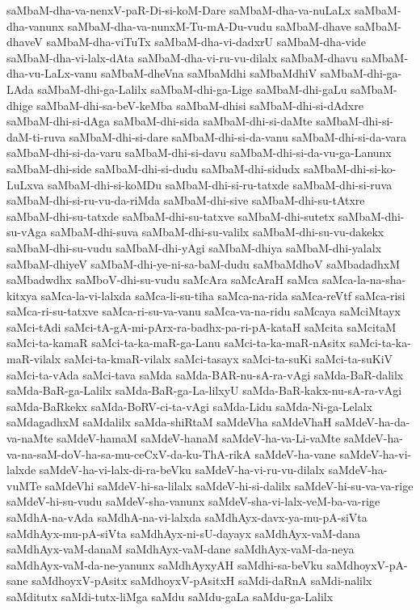 {saMbaM-dha-va-nenxV-paR-Di-si-koM-Dare
saMbaM-dha-va-nuLaLx
saMbaM-dha-vanunx
saMbaM-dha-va-nunxM-Tu-mA-Du-vudu
saMbaM-dhave
saMbaM-dhaveV
saMbaM-dha-viTuTx
saMbaM-dha-vi-dadxrU
saMbaM-dha-vide
saMbaM-dha-vi-lalx-dAta
saMbaM-dha-vi-ru-vu-dilalx
saMbaM-dhavu
saMbaM-dha-vu-LaLx-vanu
saMbaM-dheVna
saMbaMdhi
saMbaMdhiV
saMbaM-dhi-ga-LAda
saMbaM-dhi-ga-Lalilx
saMbaM-dhi-ga-Lige
saMbaM-dhi-gaLu
saMbaM-dhige
saMbaM-dhi-sa-beV-keMba
saMbaM-dhisi
saMbaM-dhi-si-dAdxre
saMbaM-dhi-si-dAga
saMbaM-dhi-sida
saMbaM-dhi-si-daMte
saMbaM-dhi-si-daM-ti-ruva
saMbaM-dhi-si-dare
saMbaM-dhi-si-da-vanu
saMbaM-dhi-si-da-vara
saMbaM-dhi-si-da-varu
saMbaM-dhi-si-davu
saMbaM-dhi-si-da-vu-ga-Lanunx
saMbaM-dhi-side
saMbaM-dhi-si-dudu
saMbaM-dhi-sidudx
saMbaM-dhi-si-ko-LuLxva
saMbaM-dhi-si-koMDu
saMbaM-dhi-si-ru-tatxde
saMbaM-dhi-si-ruva
saMbaM-dhi-si-ru-vu-da-riMda
saMbaM-dhi-sive
saMbaM-dhi-su-tAtxre
saMbaM-dhi-su-tatxde
saMbaM-dhi-su-tatxve
saMbaM-dhi-sutetx
saMbaM-dhi-su-vAga
saMbaM-dhi-suva
saMbaM-dhi-su-valilx
saMbaM-dhi-su-vu-dakekx
saMbaM-dhi-su-vudu
saMbaM-dhi-yAgi
saMbaM-dhiya
saMbaM-dhi-yalalx
saMbaM-dhiyeV
saMbaM-dhi-ye-ni-sa-baM-dudu
saMbaMdhoV
saMbadadhxM
saMbadwdhx
saMboV-dhi-su-vudu
saMcAra
saMcAraH
saMca
saMca-la-na-sha-kitxya
saMca-la-vi-lalxda
saMca-li-su-tiha
saMca-na-rida
saMca-reVtf
saMca-risi
saMca-ri-su-tatxve
saMca-ri-su-va-vanu
saMca-va-na-ridu
saMcaya
saMciMtayx
saMci-tAdi
saMci-tA-gA-mi-pArx-ra-badhx-pa-ri-pA-kataH
saMcita
saMcitaM
saMci-ta-kamaR
saMci-ta-ka-maR-ga-Lanu
saMci-ta-ka-maR-nAsitx
saMci-ta-ka-maR-vilalx
saMci-ta-kmaR-vilalx
saMci-tasayx
saMci-ta-suKi
saMci-ta-suKiV
saMci-ta-vAda
saMci-tava
saMda
saMda-BAR-nu-sA-ra-vAgi
saMda-BaR-dalilx
saMda-BaR-ga-Lalilx
saMda-BaR-ga-La-lilxyU
saMda-BaR-kakx-nu-sA-ra-vAgi
saMda-BaRkekx
saMda-BoRV-ci-ta-vAgi
saMda-Lidu
saMda-Ni-ga-Lelalx
saMdagadhxM
saMdalilx
saMda-shiRtaM
saMdeVha
saMdeVhaH
saMdeV-ha-da-va-naMte
saMdeV-hamaM
saMdeV-hanaM
saMdeV-ha-va-Li-vaMte
saMdeV-ha-va-na-saM-doV-ha-sa-mu-ceCxV-da-ku-ThA-rikA
saMdeV-ha-vane
saMdeV-ha-vi-lalxde
saMdeV-ha-vi-lalx-di-ra-beVku
saMdeV-ha-vi-ru-vu-dilalx
saMdeV-ha-vuMTe
saMdeVhi
saMdeV-hi-sa-lilalx
saMdeV-hi-si-dalilx
saMdeV-hi-su-va-va-rige
saMdeV-hi-su-vudu
saMdeV-sha-vanunx
saMdeV-sha-vi-lalx-veM-ba-va-rige
saMdhA-na-vAda
saMdhA-na-vi-lalxda
saMdhAyx-davx-ya-mu-pA-siVta
saMdhAyx-mu-pA-siVta
saMdhAyx-ni-sU-dayayx
saMdhAyx-vaM-dana
saMdhAyx-vaM-danaM
saMdhAyx-vaM-dane
saMdhAyx-vaM-da-neya
saMdhAyx-vaM-da-ne-yanunx
saMdhAyxyAH
saMdhi-sa-beVku
saMdhoyxV-pA-sane
saMdhoyxV-pAsitx
saMdhoyxV-pAsitxH
saMdi-daRnA
saMdi-nalilx
saMditutx
saMdi-tutx-liMga
saMdu
saMdu-gaLa
saMdu-ga-Lalilx
}
